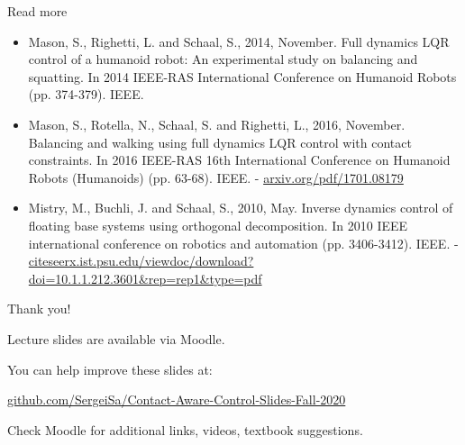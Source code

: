 \documentclass{beamer}
\begin{document}
\begin{frame}{Read more}

\begin{itemize}
\item Mason, S., Righetti, L. and Schaal, S., 2014, November. Full dynamics LQR control of a humanoid robot: An experimental study on balancing and squatting. In 2014 IEEE-RAS International Conference on Humanoid Robots (pp. 374-379). IEEE.

\item Mason, S., Rotella, N., Schaal, S. and Righetti, L., 2016, November. Balancing and walking using full dynamics LQR control with contact constraints. In 2016 IEEE-RAS 16th International Conference on Humanoid Robots (Humanoids) (pp. 63-68). IEEE. - \href{https://arxiv.org/pdf/1701.08179}{arxiv.org/pdf/1701.08179}

\item Mistry, M., Buchli, J. and Schaal, S., 2010, May. Inverse dynamics control of floating base systems using orthogonal decomposition. In 2010 IEEE international conference on robotics and automation (pp. 3406-3412). IEEE. - \href{http://citeseerx.ist.psu.edu/viewdoc/download?doi=10.1.1.212.3601&rep=rep1&type=pdf}{citeseerx.ist.psu.edu/viewdoc/download?doi=10.1.1.212.3601\&rep=rep1\&type=pdf}
\end{itemize}

\end{frame}



\begin{frame}{Thank you!}
\centerline{Lecture slides are available via Moodle.}
\bigskip
\centerline{You can help improve these slides at:}
\centerline{\href{https://github.com/SergeiSa/Contact-Aware-Control-Slides-Fall-2020}{github.com/SergeiSa/Contact-Aware-Control-Slides-Fall-2020}}
\bigskip
\centerline{Check Moodle for additional links, videos, textbook suggestions.}
\end{frame}
\end{document}
